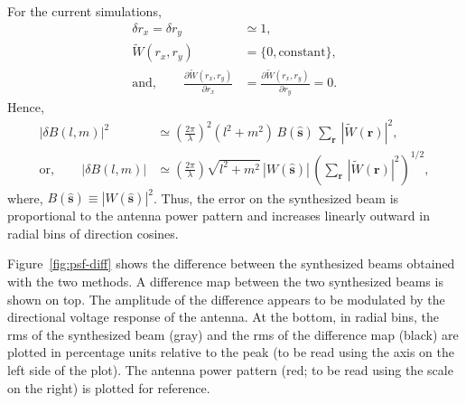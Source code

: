 \documentclass[a4paper,fleqn,usenatbib]{../mnras}
\begin{document}
For the current simulations, 
\begin{align}
  \delta r_x = \delta r_y &\simeq 1, \\
  \widetilde{W}(r_x,r_y) &= \{0, \textrm{constant}\}, \\
  \textrm{and},\qquad \frac{\partial{\widetilde{W}(r_x,r_y)}}{\partial{r_x}} &= \frac{\partial{\widetilde{W}(r_x,r_y)}}{\partial{r_y}} = 0.
\end{align}
Hence,
\begin{align}
  \left|\delta B(l,m)\right|^2 &\simeq \left(\frac{2\pi}{\lambda}\right)^2\left(l^2+m^2\right)\,B(\hat{\mathbf{s}})\,\sum_\mathbf{r}\,\left|\widetilde{W}(\mathbf{r})\right|^2, \\
\textrm{or},\qquad \left|\delta B(l,m)\right| &\simeq \left(\frac{2\pi}{\lambda}\right)\sqrt{l^2+m^2}\,\left|W(\hat{\mathbf{s}})\right|\,\left(\sum_\mathbf{r}\,\left|\widetilde{W}(\mathbf{r})\right|^2\right)^{1/2}, \label{eqn:syn-beam-error}
\end{align}
where, $B(\hat{\mathbf{s}}) \equiv \left|W(\hat{\mathbf{s}})\right|^2$. Thus, 
the error on the synthesized beam is proportional to the antenna power pattern
and increases linearly outward in radial bins of direction cosines.

Figure~\ref{fig:psf-diff} shows the difference between the synthesized beams 
obtained with the two methods. A difference map between the two synthesized 
beams is shown on top. The amplitude of the difference appears to be 
modulated by the directional voltage response of the antenna. At the bottom, 
in radial bins, the rms of the synthesized beam (gray) and the rms of the 
difference map (black) are plotted in percentage units relative to the peak 
(to be read using the axis on the left side of the plot). The antenna power 
pattern (red; to be read using the scale on the right) is plotted for reference. 
\end{document}
